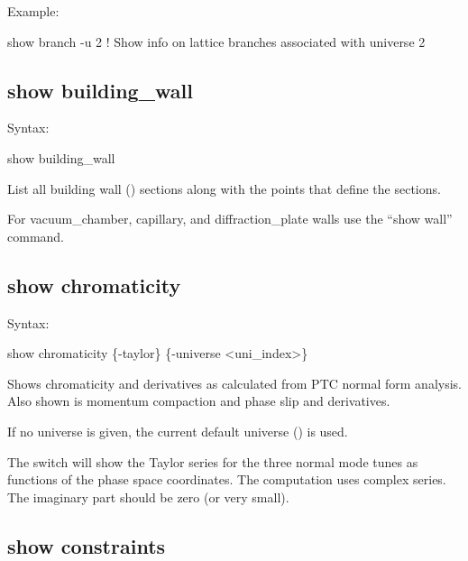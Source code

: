 {{{{{{{{Example:
\begin{example}
  show branch -u 2     ! Show info on lattice branches associated with universe 2
\end{example}


\subsection{show building_wall}
\label{s:show.building}

Syntax:
\begin{example}
  show building_wall
\end{example}

List all building wall () sections along with the points that define
the sections.

For vacuum_chamber, capillary, and diffraction_plate walls use the ``show wall'' command.


\subsection{show chromaticity}
\label{s:show.chrom}

Syntax:
\begin{example}
  show chromaticity \{-taylor\} \{-universe <uni_index>\} 
\end{example}

Shows chromaticity and derivatives as calculated from PTC normal form analysis. Also shown
is momentum compaction and phase slip and derivatives.

If no universe is given, the current default universe () is used.

The  switch will show the Taylor series for the three normal mode tunes as functions 
of the phase space coordinates. The computation uses complex series. The imaginary part should 
be zero (or very small).



\subsection{show constraints}
\label{s:show.constraints}

}}}}}}}}
